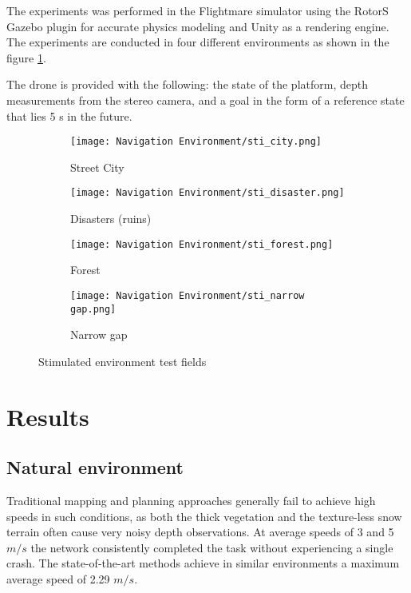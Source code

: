 The experiments was performed in the Flightmare simulator using the RotorS Gazebo plugin for accurate physics modeling and Unity as a rendering engine. The experiments are conducted in four different environments as shown in the figure \ref{fig:stimulated envt}. 

The drone is provided with the following: the state of the platform, depth measurements from the stereo camera\cite{stereoMatching}, and a goal in the form of a reference state that lies 5 s in the future. 

\begin{figure}[!h]
	\centering
	\begin{subfigure}[b]{0.48\textwidth}
		\centering
		\texttt{[image: Navigation Environment/sti\_city.png]}
		\caption{Street City}
	\end{subfigure}
	\hfill
	\begin{subfigure}[b]{0.48\textwidth}
		\centering
		\texttt{[image: Navigation Environment/sti\_disaster.png]}
		\caption{Disasters (ruins)}
	\end{subfigure}
	\hfill	
	\begin{subfigure}[b]{0.48\textwidth}
		\centering
		\texttt{[image: Navigation Environment/sti\_forest.png]}
		\caption{Forest}
	\end{subfigure}
	\hfill
	\begin{subfigure}[b]{0.48\textwidth}
		\centering
		\texttt{[image: Navigation Environment/sti\_narrow gap.png]}
		\caption{Narrow gap}
	\end{subfigure}
	
	\caption{Stimulated environment test fields}
	\label{fig:stimulated envt}
\end{figure}


\section{Results}

\subsection{Natural environment}
Traditional mapping and planning approaches generally fail to achieve high speeds in such conditions, as both the thick vegetation and the texture-less snow terrain often cause very noisy depth observations. At average speeds of 3 and 5 $m/s$ the network consistently completed the task without experiencing a single crash. The state-of-the-art methods achieve in similar environments a maximum average speed of 2.29 $m/s$.

